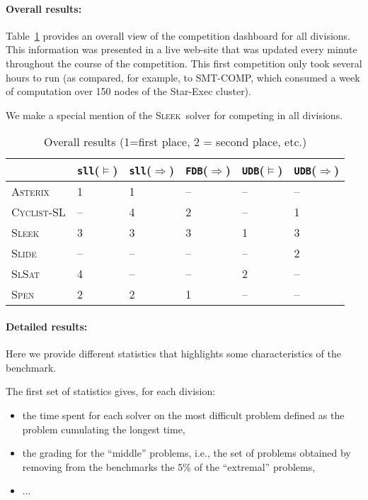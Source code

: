 \documentclass{llncs}
\newcommand{\limp}{\Rightarrow}
\newcommand{\sllsat}{\texttt{sll}($\models$)}
\newcommand{\sllent}{\texttt{sll}($\limp$)}
\newcommand{\FDBent}{\texttt{FDB}($\limp$)}
\newcommand{\UDBsat}{\texttt{UDB}($\models$)}
\newcommand{\UDBent}{\texttt{UDB}($\limp$)}
\newcommand{\ASTERIX}{\textsc{Asterix}}
\newcommand{\CYCLIST}{\textsc{Cyclist-SL}}
\newcommand{\SLEEK}{\textsc{Sleek}}
\newcommand{\SLIDE}{\textsc{Slide}}
\newcommand{\SLSAT}{\textsc{SlSat}}
\newcommand{\SPEN}{\textsc{Spen}}
\begin{document}
\paragraph{Overall results:}
Table~\ref{tab:overall} provides an overall view of the competition dashboard for all divisions. This information was presented in a live web-site that was updated every minute throughout the course of the competition. This first competition only took several hours to run (as compared, for example, to SMT-COMP, which consumed a week of computation over 150 nodes of the Star-Exec cluster).
 
We make a special mention of the \SLEEK\ solver for competing in all divisions.


\begin{table}
\begin{center}
\begin{tabular}{p{2cm}p{2cm}p{2cm}p{2cm}p{2cm}p{1cm}}\hline
& \sllsat & \sllent & \FDBent
& \UDBsat & \UDBent \\\hline
\ASTERIX &
1 &
1 &
-- &
-- &
--
\\\hline
\CYCLIST &
-- &
4 &
2 &
-- &
1 
\\\hline
\SLEEK &
3 &
3 &
3 &
1 &
3
\\\hline
\SLIDE &
-- &
-- &
-- &
-- &
2
\\\hline
\SLSAT &
4  &
--  &
--  &
2  &
--
\\\hline
\SPEN &
2 &
2 &
1 &
-- &
--
\\\hline
\end{tabular}
\end{center}
\caption{Overall results (1=first place, 2 = second place, etc.)}
\label{tab:overall}
\end{table}


\paragraph{Detailed results:}
Here we provide different statistics that highlights some characteristics of the benchmark. 

The first set of statistics gives, for each division:
\begin{itemize}
\item the time spent for each solver on the most difficult problem defined as the problem cumulating the longest time,
\item the grading for the ``middle'' problems, i.e., the set of problems obtained by removing from the benchmarks the 5\% of the ``extremal'' problems,
\item ...
\end{itemize}
\end{document}
